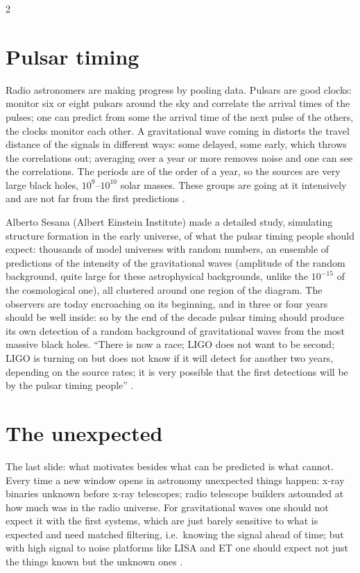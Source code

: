\begin{paracol}{2}
\section{Pulsar timing}\label{sec:c27-pta}

Radio astronomers are making progress by pooling data. Pulsars are good clocks: monitor six or eight pulsars around the sky and correlate the arrival times of the pulses; one can predict from some the arrival time of the next pulse of the others, the clocks monitor each other. A gravitational wave coming in distorts the travel distance of the signals in different ways: some delayed, some early, which throws the correlations out; averaging over a year or more removes noise and one can see the correlations. The periods are of the order of a year, so the sources are very large black holes, $10^9$--$10^{10}$ solar masses. These groups are going at it intensively and are not far from the first predictions .

Alberto Sesana (Albert Einstein Institute) made a detailed study, simulating structure formation in the early universe, of what the pulsar timing people should expect: thousands of model universes with random numbers, an ensemble of predictions of the intensity of the gravitational waves (amplitude of the random background, quite large for these astrophysical backgrounds, unlike the $10^{-15}$ of the cosmological one), all clustered around one region of the diagram. The observers are today encroaching on its beginning, and in three or four years should be well inside: so by the end of the decade pulsar timing should produce its own detection of a random background of gravitational waves from the most massive black holes. ``There is now a race; LIGO does not want to be second; LIGO is turning on but does not know if it will detect for another two years, depending on the source rates; it is very possible that the first detections will be by the pulsar timing people'' .

\section{The unexpected}\label{sec:c27-unexpected}

The last slide: what motivates besides what can be predicted is what cannot. Every time a new window opens in astronomy unexpected things happen: x-ray binaries unknown before x-ray telescopes; radio telescope builders astounded at how much was in the radio universe. For gravitational waves one should not expect it with the first systems, which are just barely sensitive to what is expected and need matched filtering, i.e.\ knowing the signal ahead of time; but with high signal to noise platforms like LISA and ET one should expect not just the things known but the unknown ones .


\end{paracol}
